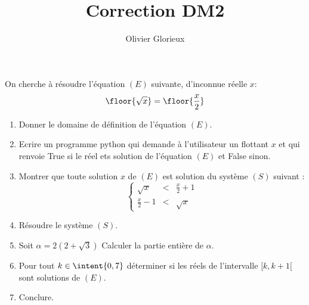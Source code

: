 \documentclass[a4paper, 11pt,reqno]{article}
\author{Olivier Glorieux}
\begin{document}
\title{Correction DM2 
}





\begin{exercice}
On cherche à résoudre l'équation $(E)$ suivante, d'inconnue réelle $x$: 
$$\floor{\sqrt{x}} = \floor{ \frac{x}{2}}$$
\begin{enumerate}
\item Donner le domaine de définition de  l'équation $(E)$. 
\item Ecrire un programme python qui demande à l'utilisateur un flottant $x$ et qui renvoie True si le réel ets solution de l'équation $(E)$  et False sinon. 
\item Montrer que toute solution $x$  de $(E)$ est solution du système $(S)$ suivant : 
$$\left\{ 
\begin{array}{ccc}
\sqrt{x}&<& \frac{x}{2}+1\\
\frac{x}{2}-1&<& \sqrt{x}
\end{array}
\right. $$
\item Résoudre le système $(S)$. 
\item Soit $\alpha = 2(2+\sqrt{3})$ Calculer la partie entière de $\alpha$. 
\item Pour tout $k\in \intent{0,7} $ déterminer si les réels de l'intervalle $[k,k+1[$ sont solutions de $(E)$. 
\item Conclure.  
\end{enumerate}
\end{exercice}
\end{document}
